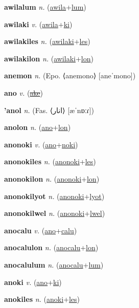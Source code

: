 \textbf{\hypertarget{awilalum}{awilalum}} \textit{n.} (\hyperlink{awila}{awila}+\allowbreak \hyperlink{lum}{lum})


\textbf{\hypertarget{awilaki}{awilaki}} \textit{v.} (\hyperlink{awila}{awila}+\allowbreak \hyperlink{ki}{ki})


\textbf{\hypertarget{awilakiles}{awilakiles}} \textit{n.} (\hyperlink{awilaki}{awilaki}+\allowbreak \hyperlink{les}{les})


\textbf{\hypertarget{awilakilon}{awilakilon}} \textit{n.} (\hyperlink{awilaki}{awilaki}+\allowbreak \hyperlink{lon}{lon})


\textbf{\hypertarget{anemon}{anemon}} \textit{n.} (Epo. ⟨anemono⟩ [aneˈmono])


\textbf{\hypertarget{ano}{ano}} \textit{v.} (\hyperlink{ake}{\sout{ake}})


\textbf{\hypertarget{'anol}{'anol}} \textit{n.} (Fas. ⟨{\arabics{}انار}⟩ [æˈnɒːɾ])


\textbf{\hypertarget{anolon}{anolon}} \textit{n.} (\hyperlink{ano}{ano}+\allowbreak \hyperlink{lon}{lon})


\textbf{\hypertarget{anonoki}{anonoki}} \textit{v.} (\hyperlink{ano}{ano}+\allowbreak \hyperlink{noki}{noki})


\textbf{\hypertarget{anonokiles}{anonokiles}} \textit{n.} (\hyperlink{anonoki}{anonoki}+\allowbreak \hyperlink{les}{les})


\textbf{\hypertarget{anonokilon}{anonokilon}} \textit{n.} (\hyperlink{anonoki}{anonoki}+\allowbreak \hyperlink{lon}{lon})


\textbf{\hypertarget{anonokilyot}{anonokilyot}} \textit{n.} (\hyperlink{anonoki}{anonoki}+\allowbreak \hyperlink{lyot}{lyot})


\textbf{\hypertarget{anonokilwel}{anonokilwel}} \textit{n.} (\hyperlink{anonoki}{anonoki}+\allowbreak \hyperlink{lwel}{lwel})


\textbf{\hypertarget{anocalu}{anocalu}} \textit{v.} (\hyperlink{ano}{ano}+\allowbreak \hyperlink{calu}{calu})


\textbf{\hypertarget{anocalulon}{anocalulon}} \textit{n.} (\hyperlink{anocalu}{anocalu}+\allowbreak \hyperlink{lon}{lon})


\textbf{\hypertarget{anocalulum}{anocalulum}} \textit{n.} (\hyperlink{anocalu}{anocalu}+\allowbreak \hyperlink{lum}{lum})


\textbf{\hypertarget{anoki}{anoki}} \textit{v.} (\hyperlink{ano}{ano}+\allowbreak \hyperlink{ki}{ki})


\textbf{\hypertarget{anokiles}{anokiles}} \textit{n.} (\hyperlink{anoki}{anoki}+\allowbreak \hyperlink{les}{les})


